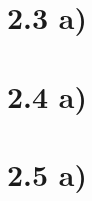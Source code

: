\documentclass[12pt]{article}
\begin{document}
    \section*{2.3 a)}
    \vskip -0.3cm
    

    \newpage
    \section*{2.4 a)}
    \vskip -0.3cm
    

    \newpage
    \section*{2.5 a)}
    \vskip -0.3cm
    
\end{document}
